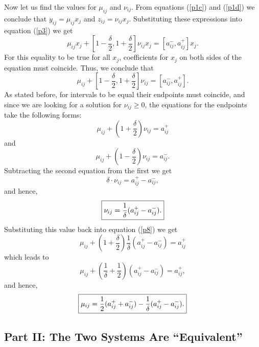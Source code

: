 Now let us find the values for $\mu_{ij}$ and $\nu_{ij}$.  From
equations (\ref{p1c}) and (\ref{p1d}) we conclude that $y_{ij}=\mu_{ij}x_j$
and $z_{ij}=\nu_{ij}x_j$.  Substituting these expressions into equation
(\ref{p3}) we get
$$
  \mu_{ij} x_j + [1-\frac{\delta}{2},1+\frac{\delta}{2}] \nu_{ij} x_j =
   [a_{ij}^-, a_{ij}^+] x_j.
$$
For this equality to be true for all $x_j$, coefficients for $x_j$ on both
sides of the equation must coincide.  Thus, we conclude that
$$
  \mu_{ij} + [1 - \frac{\delta}{2}, 1 + \frac{\delta}{2}] \nu_{ij} =
   [a_{ij}^-, a_{ij}^+].
$$
As stated before, for intervals to be equal their endpoints must coincide,
and since we are looking for a solution for $\nu_{ij}\geq 0$, the equations
for the endpoints take the following forms:
\begin{equation}
  \mu_{ij} + (1 + \frac{\delta}{2}) \nu_{ij} = a_{ij}^+ \label{p8}
\end{equation}
and
\begin{equation}
  \mu_{ij} + (1 - \frac{\delta}{2}) \nu_{ij} = a_{ij}^-. \label{p9}
\end{equation}
Subtracting the second equation from the first we get
$$
  \delta\cdot\nu_{ij} = a_{ij}^+ - a_{ij}^-,
$$
and hence,
\begin{equation}
  \fbox{${\displaystyle\nu_{ij}=\frac{1}{\delta}(a_{ij}^+-a_{ij}^-).}$}
                                                                     \label{NU}
\end{equation}
Substituting this value back into equation (\ref{p8}) we get
$$
  \mu_{ij} + (1 + \frac{\delta}{2}) \frac{1}{\delta}(a_{ij}^+ - a_{ij}^-) =
   a_{ij}^+
$$
which leads to
$$
  \mu_{ij}+(\frac{1}{\delta}+\frac{1}{2})(a_{ij}^+ - a_{ij}^-) = a_{ij}^+,
$$
and hence,
\begin{equation}
  \fbox{${\displaystyle\mu_{ij}=\frac{1}{2}(a_{ij}^++a_{ij}^-)
   -\frac{1}{\delta}(a_{ij}^+-a_{ij}^-).}$}                          \label{MU}
\end{equation}

\newpage
\subsection{Part II: The Two Systems Are ``Equivalent''}

